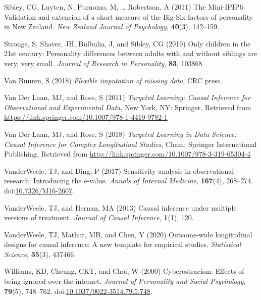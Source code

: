 \documentclass[
  singlecolumn]{article}
\newlength{\cslhangindent}
\newenvironment{CSLReferences}[2] %
 {\begin{list}{}{%
  \setlength{\itemindent}{0pt}
  \setlength{\leftmargin}{0pt}
  \setlength{\parsep}{0pt}
  \ifodd #1
   \setlength{\leftmargin}{\cslhangindent}
   \setlength{\itemindent}{-1\cslhangindent}
  \fi
  \setlength{\itemsep}{#2\baselineskip}}}
 {\end{list}}
\begin{document}
\begin{CSLReferences}{1}{0}
Sibley, CG, Luyten, N, Purnomo, M, \ldots{} Robertson, A (2011) The
Mini-IPIP6: Validation and extension of a short measure of the Big-Six
factors of personality in New Zealand. \emph{New Zealand Journal of
Psychology}, \textbf{40}(3), 142--159.

Stronge, S, Shaver, JH, Bulbulia, J, and Sibley, CG (2019) Only children
in the 21st century: Personality differences between adults with and
without siblings are very, very small. \emph{Journal of Research in
Personality}, \textbf{83}, 103868.

Van Buuren, S (2018) \emph{Flexible imputation of missing data}, CRC
press.

Van Der Laan, MJ, and Rose, S (2011) \emph{Targeted Learning: Causal
Inference for Observational and Experimental Data}, New York, NY:
Springer. Retrieved from
\url{https://link.springer.com/10.1007/978-1-4419-9782-1}

Van Der Laan, MJ, and Rose, S (2018) \emph{Targeted Learning in Data
Science: Causal Inference for Complex Longitudinal Studies}, Cham:
Springer International Publishing. Retrieved from
\url{http://link.springer.com/10.1007/978-3-319-65304-4}

VanderWeele, TJ, and Ding, P (2017) Sensitivity analysis in
observational research: Introducing the e-value. \emph{Annals of
Internal Medicine}, \textbf{167}(4), 268--274.
doi:\href{https://doi.org/10.7326/M16-2607}{10.7326/M16-2607}.

VanderWeele, TJ, and Hernan, MA (2013) Causal inference under multiple
versions of treatment. \emph{Journal of Causal Inference},
\textbf{1}(1), 120.

VanderWeele, TJ, Mathur, MB, and Chen, Y (2020) Outcome-wide
longitudinal designs for causal inference: A new template for empirical
studies. \emph{Statistical Science}, \textbf{35}(3), 437466.

Williams, KD, Cheung, CKT, and Choi, W (2000) Cyberostracism: Effects of
being ignored over the internet. \emph{Journal of Personality and Social
Psychology}, \textbf{79}(5), 748--762.
doi:\href{https://doi.org/10.1037/0022-3514.79.5.748}{10.1037/0022-3514.79.5.748}.


\end{CSLReferences}
\end{document}
